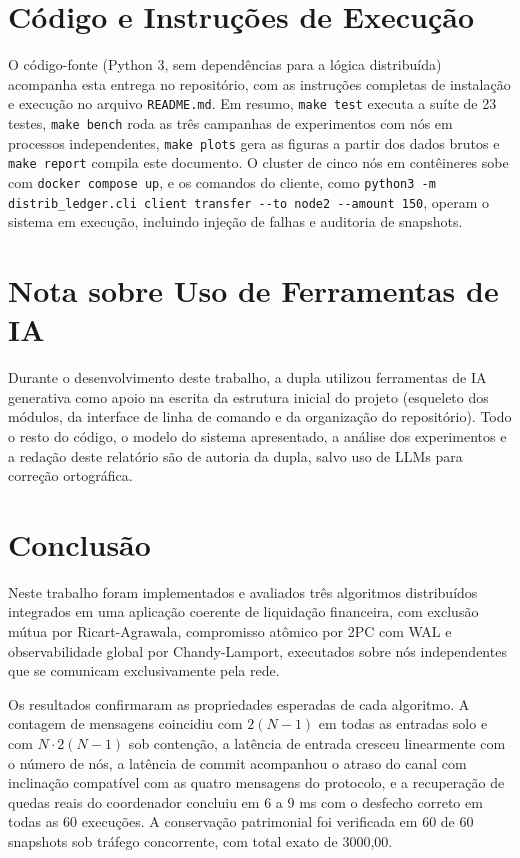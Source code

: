 \documentclass[conference]{IEEEtran}
\begin{document}
\section*{Código e Instruções de Execução}
O código-fonte (Python 3, sem dependências para a lógica distribuída)
acompanha esta entrega no repositório, com as instruções completas de
instalação e execução no arquivo \texttt{README.md}. Em resumo, \texttt{make
test} executa a suíte de 23 testes, \texttt{make bench} roda as três campanhas
de experimentos com nós em processos independentes, \texttt{make plots} gera
as figuras a partir dos dados brutos e \texttt{make report} compila este
documento. O cluster de cinco nós em contêineres sobe com \texttt{docker
compose up}, e os comandos do cliente, como \texttt{python3 -m
distrib\_ledger.cli client transfer -{}-to node2 -{}-amount 150}, operam o
sistema em execução, incluindo injeção de falhas e auditoria de snapshots.

\section*{Nota sobre Uso de Ferramentas de IA}
Durante o desenvolvimento deste trabalho, a dupla utilizou ferramentas de IA
generativa como apoio na escrita da estrutura inicial do projeto (esqueleto
dos módulos, da interface de linha de comando e da organização do
repositório). Todo o resto do código, o modelo do sistema apresentado, a
análise dos experimentos e a redação deste relatório são de autoria da dupla,
salvo uso de LLMs para correção ortográfica.

\section{Conclusão}
Neste trabalho foram implementados e avaliados três algoritmos distribuídos
integrados em uma aplicação coerente de liquidação financeira, com exclusão
mútua por Ricart-Agrawala, compromisso atômico por 2PC com WAL e
observabilidade global por Chandy-Lamport, executados sobre nós independentes
que se comunicam exclusivamente pela rede.

Os resultados confirmaram as propriedades esperadas de cada algoritmo. A
contagem de mensagens coincidiu com $2(N-1)$ em todas as entradas solo e com
$N \cdot 2(N-1)$ sob contenção, a latência de entrada cresceu linearmente com
o número de nós, a latência de commit acompanhou o atraso do canal com
inclinação compatível com as quatro mensagens do protocolo, e a recuperação
de quedas reais do coordenador concluiu em 6 a 9 ms com o desfecho correto em
todas as 60 execuções. A conservação patrimonial foi verificada em 60 de 60
snapshots sob tráfego concorrente, com total exato de 3000{,}00.
\end{document}
